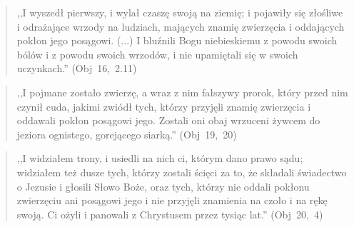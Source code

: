 \documentclass[10pt,a4paper,oneside]{article}
\begin{document}
\begin{quote}
,,I wyszedł pierwszy, i wylał czaszę swoją na ziemię; i pojawiły się złośliwe i odrażające wrzody na ludziach, mających znamię zwierzęcia i oddających pokłon jego posągowi. (...) I bluźnili Bogu niebieskiemu z powodu swoich bólów i z powodu swoich wrzodów, i nie upamiętali się w swoich uczynkach.'' (Obj~16,~2.11)
\end{quote}
\begin{quote}
,,I pojmane zostało zwierzę, a wraz z nim fałszywy prorok, który przed nim czynił cuda, jakimi zwiódł tych, którzy przyjęli znamię zwierzęcia i oddawali pokłon posągowi jego. Zostali oni obaj wrzuceni żywcem do jeziora ognistego, gorejącego siarką.'' (Obj~19,~20)
\end{quote}
\begin{quote}
,,I widziałem trony, i usiedli na nich ci, którym dano prawo sądu; widziałem też dusze tych, którzy zostali ścięci za to, że składali świadectwo o Jezusie i głosili Słowo Boże, oraz tych, którzy nie oddali pokłonu zwierzęciu ani posągowi jego i nie przyjęli znamienia na czoło i na rękę swoją. Ci ożyli i panowali z Chrystusem przez tysiąc lat.'' (Obj~20,~4)
\end{quote}
\end{document}
